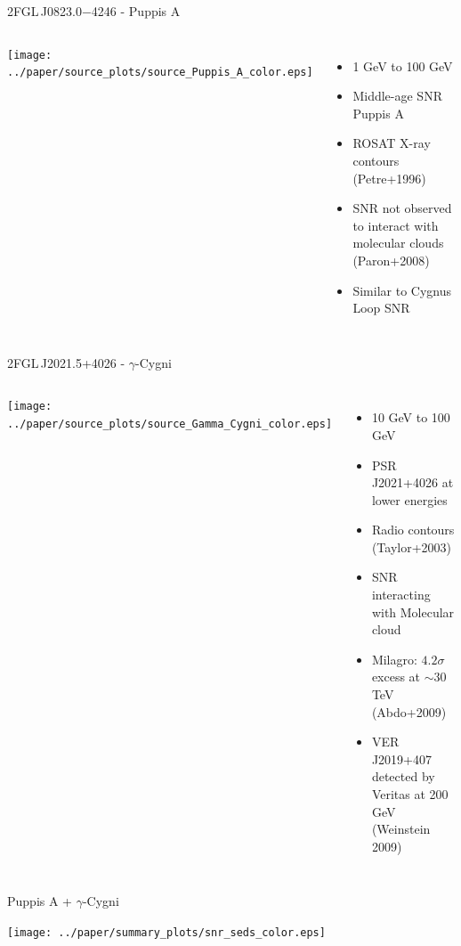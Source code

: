 \documentclass[12pt]{beamer}
\begin{document}
\begin{frame}{2FGL\,J0823.0$-$4246 - Puppis A}
  \begin{columns}
    \texttt{[image: ../paper/source\_plots/source\_Puppis\_A\_color.eps]}
    \begin{itemize}
      \item 1 GeV to 100 GeV
      \item Middle-age SNR Puppis A
      \item ROSAT X-ray contours (Petre+1996)
      \item SNR not observed to interact with molecular clouds 
        (Paron+2008)
      \item Similar to Cygnus Loop SNR
    \end{itemize}
  \end{columns}
\end{frame}

\begin{frame}{2FGL\,J2021.5+4026 - $\gamma$-Cygni}
  \begin{columns}
    \texttt{[image: ../paper/source\_plots/source\_Gamma\_Cygni\_color.eps]}
    \begin{itemize}
      \item 10 GeV to 100 GeV
      \item PSR\,J2021+4026 at lower energies
      \item Radio contours (Taylor+2003)
      \item SNR interacting with Molecular cloud
      \item Milagro: $4.2\sigma$ excess at $\sim 30$ TeV (Abdo+2009)
      \item 
        VER\,J2019+407 
        detected by Veritas at 200 GeV (Weinstein 2009)
    \end{itemize}
  \end{columns}
\end{frame}


\begin{frame}{Puppis A + $\gamma$-Cygni}
  \begin{center}
    \texttt{[image: ../paper/summary\_plots/snr\_seds\_color.eps]}
  \end{center}
\end{frame}
\end{document}
